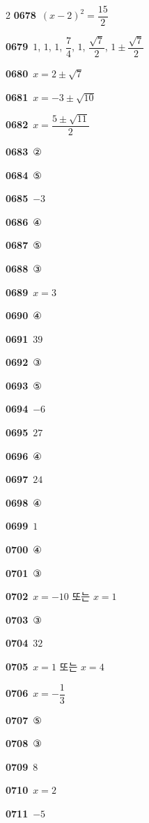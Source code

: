 \documentclass[10pt,a4paper]{article}
\begin{document}
\begin{multicols}{2}
\noindent\textbf{0678}\ $(x-2)^2=\dfrac{15}{2}$\par
\noindent\textbf{0679}\ $1$, $1$, $1$, $\dfrac{7}{4}$, $1$, $\dfrac{\sqrt{7}}{2}$, $1\pm\dfrac{\sqrt{7}}{2}$\par
\noindent\textbf{0680}\ $x=2\pm\sqrt{7}$\par
\noindent\textbf{0681}\ $x=-3\pm\sqrt{10}$\par
\noindent\textbf{0682}\ $x=\dfrac{5\pm\sqrt{11}}{2}$\par
\noindent\textbf{0683}\ ②\par
\noindent\textbf{0684}\ ⑤\par
\noindent\textbf{0685}\ $-3$\par
\noindent\textbf{0686}\ ④\par
\noindent\textbf{0687}\ ⑤\par
\noindent\textbf{0688}\ ③\par
\noindent\textbf{0689}\ $x=3$\par
\noindent\textbf{0690}\ ④\par
\noindent\textbf{0691}\ $39$\par
\noindent\textbf{0692}\ ③\par
\noindent\textbf{0693}\ ⑤\par
\noindent\textbf{0694}\ $-6$\par
\noindent\textbf{0695}\ $27$\par
\noindent\textbf{0696}\ ④\par
\noindent\textbf{0697}\ $24$\par
\noindent\textbf{0698}\ ④\par
\noindent\textbf{0699}\ $1$\par
\noindent\textbf{0700}\ ④\par
\noindent\textbf{0701}\ ③\par
\noindent\textbf{0702}\ $x=-10$ 또는 $x=1$\par
\noindent\textbf{0703}\ ③\par
\noindent\textbf{0704}\ $32$\par
\noindent\textbf{0705}\ $x=1$ 또는 $x=4$\par
\noindent\textbf{0706}\ $x=-\dfrac{1}{3}$\par
\noindent\textbf{0707}\ ⑤\par
\noindent\textbf{0708}\ ③\par
\noindent\textbf{0709}\ $8$\par
\noindent\textbf{0710}\ $x=2$\par
\noindent\textbf{0711}\ $-5$\par

\end{multicols}
\end{document}
